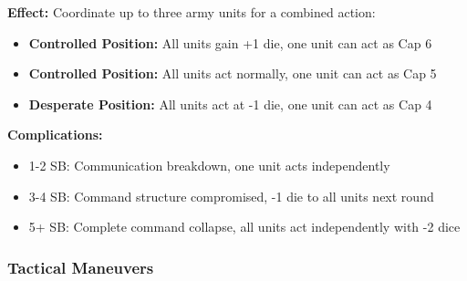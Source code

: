 \documentclass[11pt,letterpaper]{article}
\begin{document}
\textbf{Effect:} Coordinate up to three army units for a combined action:
\begin{itemize}[leftmargin=*]
    \item \textbf{Controlled Position:} All units gain +1 die, one unit can act as Cap 6
    \item \textbf{Controlled Position:} All units act normally, one unit can act as Cap 5
    \item \textbf{Desperate Position:} All units act at -1 die, one unit can act as Cap 4
\end{itemize}

\textbf{Complications:}
\begin{itemize}[leftmargin=*]
    \item 1-2 SB: Communication breakdown, one unit acts independently
    \item 3-4 SB: Command structure compromised, -1 die to all units next round
    \item 5+ SB: Complete command collapse, all units act independently with -2 dice
\end{itemize}

\subsubsection{Tactical Maneuvers}
\end{document}
